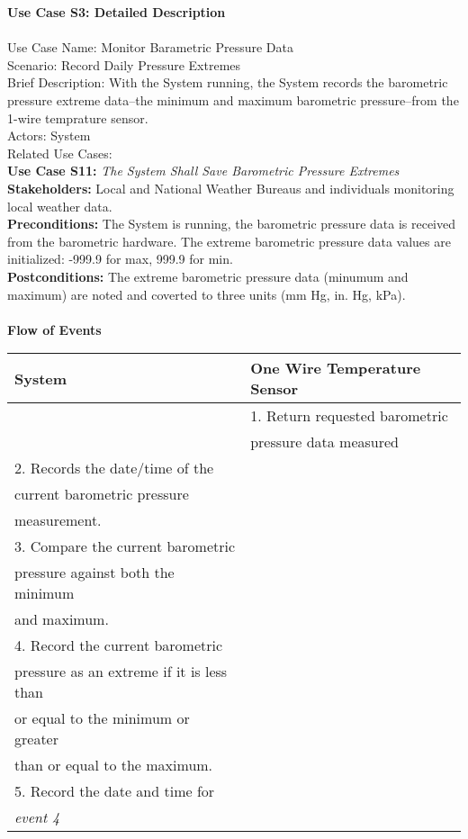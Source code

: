 \documentclass[letterpaper]{article}
\begin{document}
\noindent
\textbf{Use Case S3:  Detailed Description}\\\\
Use Case Name:  Monitor Barametric Pressure Data\\
Scenario:  Record  Daily Pressure Extremes\\
Brief Description:  With the System running, the System records the
barometric pressure extreme data--the minimum and maximum barometric
pressure--from the 1-wire temprature sensor.\\
Actors:  System\\
Related Use Cases:\\
\textbf{Use Case S11:  }\emph{The System Shall Save Barometric
Pressure Extremes}\\
\textbf{Stakeholders:  }Local and National Weather Bureaus and
individuals monitoring local weather data.\\
\textbf{Preconditions:  }The System is running, the barometric pressure
data is received from the barometric hardware. The extreme barometric
pressure
data values are initialized: -999.9 for max, 999.9 for min.\\
\textbf{Postconditions:  }The extreme barometric pressure data (minumum
and maximum) are  noted and coverted to three units
(mm Hg, in. Hg, kPa).\\\\
\textbf{Flow of Events}\\
\begin{tabular}{|l|l|}\hline
\textbf{System} & \textbf{One Wire Temperature Sensor}\\\hline
& 1.  Return requested barometric\\ 
&      pressure data  measured\\\hline
2.     Records the date/time of the & \\
current barometric pressure &\\
 measurement. & \\\hline
3.     Compare the current barometric & \\
pressure against both the minimum & \\
and maximum. &\\\hline
4.     Record the current barometric & \\
pressure as an extreme if it is less than & \\
 or equal to the minimum or greater & \\
than or equal to the maximum. & \\\hline
5.    Record the date and time for & \\
\emph{event 4} & \\\hline
\end{tabular}\\\\
\end{document}

